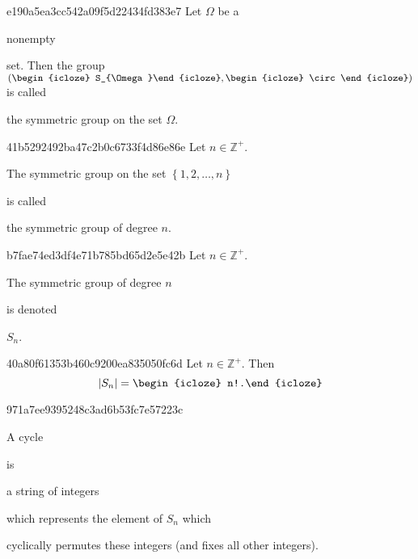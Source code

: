 \begin{note}{e190a5ea3cc542a09f5d22434fd383e7}
    Let \({ \Omega }\) be a \begin{icloze}{4}nonempty\end{icloze} set. Then the group \({ (\begin{icloze}{2}S_{\Omega}\end{icloze}, \begin{icloze}{3}\circ\end{icloze}) }\) is called \begin{icloze}{1}the symmetric group on the set \({ \Omega }\).\end{icloze}
\end{note}

\begin{note}{41b5292492ba47c2b0c6733f4d86e86e}
    Let \({ n \in \mathbb Z^{+} }\).
    \begin{icloze}{2}The symmetric group on the set \({ \left\{ 1, 2, \ldots, n \right\} }\)\end{icloze} is called \begin{icloze}{1}the symmetric group of degree \({ n }\).\end{icloze}
\end{note}

\begin{note}{b7fae74ed3df4e71b785bd65d2e5e42b}
    Let \({ n \in \mathbb Z^{+} }\).
    \begin{icloze}{2}The symmetric group of degree \({ n }\)\end{icloze} is denoted \begin{icloze}{1}\({ S_n }\).\end{icloze}
\end{note}

\begin{note}{40a80f61353b460c9200ea835050fc6d}
    Let \({ n \in \mathbb Z^{+} }\). Then
    \[
        \left\lvert S_n \right\rvert = \begin{icloze}{1}n!.\end{icloze}
    \]
\end{note}

\begin{note}{971a7ee9395248c3ad6b53fc7e57223c}
    \begin{icloze}{3}A cycle\end{icloze} is \begin{icloze}{1}a string of integers\end{icloze} which represents the element of \({ S_n }\) which \begin{icloze}{2}cyclically permutes these integers (and fixes all other integers).\end{icloze}
\end{note}


